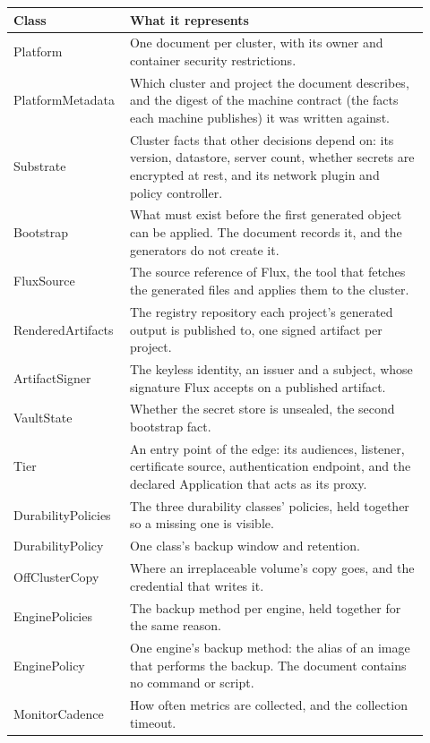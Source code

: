 \begin{table}[!htbp]
\centering
\small
\begin{tabular}{>{\raggedright\arraybackslash}p{0.22\linewidth}>{\raggedright\arraybackslash}p{0.70\linewidth}}
\hline
\textbf{Class} & \textbf{What it represents} \\
\hline
Platform & One document per cluster, with its owner and container security restrictions. \\
PlatformMetadata & Which cluster and project the document describes, and the digest of the machine contract (the facts each machine publishes) it was written against. \\
Substrate & Cluster facts that other decisions depend on: its version, datastore, server count, whether secrets are encrypted at rest, and its network plugin and policy controller. \\
Bootstrap & What must exist before the first generated object can be applied. The document records it, and the generators do not create it. \\
FluxSource & The source reference of Flux, the tool that fetches the generated files and applies them to the cluster. \\
RenderedArtifacts & The registry repository each project's generated output is published to, one signed artifact per project. \\
ArtifactSigner & The keyless identity, an issuer and a subject, whose signature Flux accepts on a published artifact. \\
VaultState & Whether the secret store is unsealed, the second bootstrap fact. \\
Tier & An entry point of the edge: its audiences, listener, certificate source, authentication endpoint, and the declared Application that acts as its proxy. \\
DurabilityPolicies & The three durability classes' policies, held together so a missing one is visible. \\
DurabilityPolicy & One class's backup window and retention. \\
OffClusterCopy & Where an irreplaceable volume's copy goes, and the credential that writes it. \\
EnginePolicies & The backup method per engine, held together for the same reason. \\
EnginePolicy & One engine's backup method: the alias of an image that performs the backup. The document contains no command or script. \\
MonitorCadence & How often metrics are collected, and the collection timeout. \\

\end{tabular}
\end{table}
